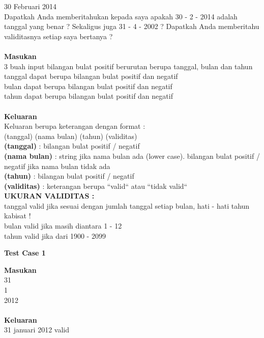 \newpage
\begin{permasalahan}{30 Februari 2014}\\
\label{prob:30Februari}
Dapatkah Anda memberitahukan kepada saya apakah 30 - 2 - 2014 adalah tanggal yang benar ?  Sekaligus juga 31 - 4 - 2002 ? Dapatkah Anda memberitahu validitasnya setiap saya bertanya ? \\\\
	\textbf{Masukan}\\
	3 buah input bilangan bulat positif berurutan berupa tanggal, bulan dan tahun\\
	tanggal dapat berupa bilangan bulat positif dan negatif\\
	bulan dapat berupa bilangan bulat positif dan negatif\\
	tahun dapat berupa bilangan bulat positif dan negatif\\\\
	\textbf{Keluaran}\\
	Keluaran berupa keterangan dengan format :\\
	(tanggal) (nama bulan) (tahun) (validitas)\\
	\textbf{(tanggal)} : bilangan bulat positif / negatif \\
	\textbf{(nama bulan)} : string jika nama bulan ada (lower case). bilangan bulat positif / negatif jika nama bulan tidak ada\\
	\textbf{(tahun)} : bilangan bulat positif / negatif\\
	\textbf{(validitas)} : keterangan berupa ``valid`` atau ``tidak valid``\\

	\textbf{UKURAN VALIDITAS : }\\
	tanggal valid jika sesuai dengan jumlah tanggal setiap bulan, hati - hati tahun kabisat ! \\
	bulan valid jika masih diantara 1 - 12 \\
	tahun valid jika dari 1900 - 2099 \\

	\begin{center}
	\textbf{Test Case 1}\\
	\end{center}
	\textbf{Masukan}\\
	31 \\
	1 \\
	2012 \\\\
	\textbf{Keluaran}\\
	31 januari 2012 valid \\\\
	

\end{permasalahan}
